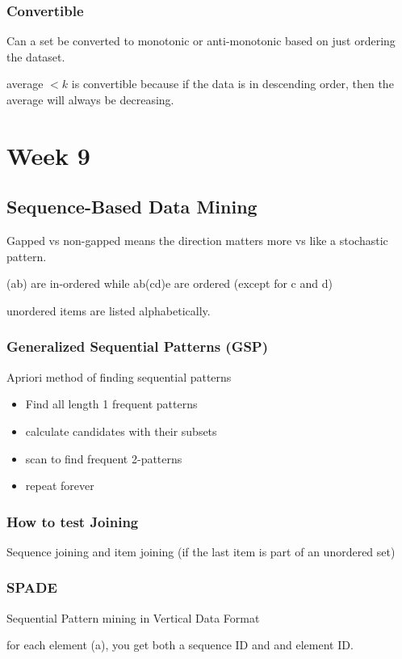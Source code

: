 \documentclass[fleqn]{report}
\begin{document}
\subsection{Convertible}
Can a set be converted to monotonic or anti-monotonic based 
on just ordering the dataset.

average $< k$ is convertible because if the data is 
in descending order, then the average will always be decreasing.

\chapter{Week 9}
\section{Sequence-Based Data Mining}
Gapped vs non-gapped means the direction matters more vs like a stochastic 
pattern. 

(ab) are in-ordered while ab(cd)e are ordered (except for c and d)

unordered items are listed alphabetically.

\subsection{Generalized Sequential Patterns (GSP)}
Apriori method of finding sequential patterns

\begin{itemize}
    \item 
    Find all length 1 frequent patterns 
    \item 
    calculate candidates with their subsets
    \item 
    scan to find frequent 2-patterns
    \item
    repeat forever
\end{itemize}

\subsection{How to test Joining }
Sequence joining and item joining (if the last item is 
part of an unordered set)

\subsection{SPADE}
Sequential Pattern mining in Vertical Data Format

for each element (a),  you get both a sequence ID and 
and element ID. 
\end{document}
